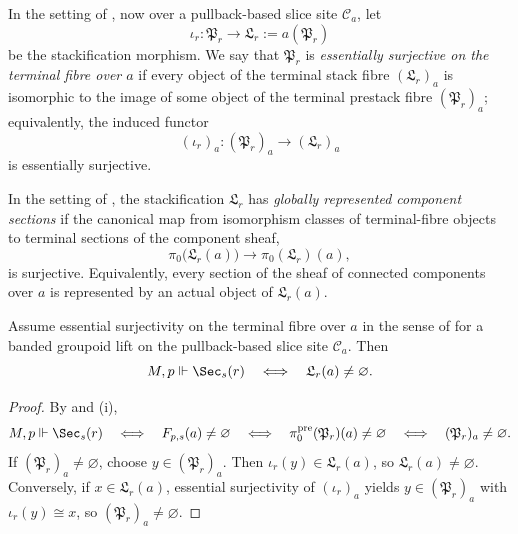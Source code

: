 \begin{definition}\label{def:global-conservativity}
In the setting of , now over a pullback-based slice site $\mathcal C_a$, let
\[
\iota_r:\mathfrak P_r\to \mathfrak L_r:=a(\mathfrak P_r)
\]
be the stackification morphism. We say that $\mathfrak P_r$ is \emph{essentially surjective on the terminal fibre over $a$} if every object of the terminal stack fibre $(\mathfrak L_r)_a$ is isomorphic to the image of some object of the terminal prestack fibre $(\mathfrak P_r)_a$; equivalently, the induced functor
\[
(\iota_r)_a:(\mathfrak P_r)_a\to (\mathfrak L_r)_a
\]
is essentially surjective.
\end{definition}

\begin{definition}\label{def:terminal-component-effectivity}
In the setting of , the stackification
$\mathfrak L_r$ has \emph{globally represented component sections} if the canonical
map from isomorphism classes of terminal-fibre objects to terminal sections
of the component sheaf,
\[
\pi_0\bigl(\mathfrak L_r(a)\bigr)\longrightarrow \pi_0(\mathfrak L_r)(a),
\]
is surjective. Equivalently, every section of the sheaf of connected
components over $a$ is represented by an actual object of
$\mathfrak L_r(a)$.
\end{definition}

\begin{proposition}\label{prop:no-new-global-objects}
Assume essential surjectivity on the terminal fibre over $a$ in the sense of  for a banded groupoid lift on the pullback-based slice site $\mathcal C_a$. Then
\[
M,p\Vdash \Sec_s(r)
\quad\Longleftrightarrow\quad
\mathfrak L_r(a)\neq\varnothing.
\]
\end{proposition}

\begin{proof}
By  and (i),
\[
M,p\Vdash \Sec_s(r)
\quad\Longleftrightarrow\quad
F_{p,s}(a)\neq\varnothing
\quad\Longleftrightarrow\quad
\pi_0^{\mathrm{pre}}(\mathfrak P_r)(a)\neq\varnothing
\quad\Longleftrightarrow\quad
(\mathfrak P_r)_a\neq\varnothing.
\]
If $(\mathfrak P_r)_a\neq\varnothing$, choose $y\in (\mathfrak P_r)_a$. Then $\iota_r(y)\in \mathfrak L_r(a)$, so $\mathfrak L_r(a)\neq\varnothing$. Conversely, if $x\in \mathfrak L_r(a)$, essential surjectivity of $(\iota_r)_a$ yields $y\in (\mathfrak P_r)_a$ with $\iota_r(y)\cong x$, so $(\mathfrak P_r)_a\neq\varnothing$.
\end{proof}

